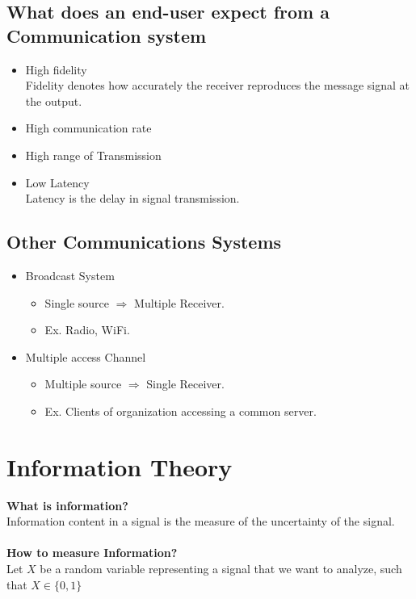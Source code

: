\documentclass{article}
\begin{document}
\newpage
\subsection{What does an end-user expect from a Communication  system}
\Large
\begin{itemize}
    \item High fidelity\\
    Fidelity denotes how accurately the receiver reproduces the message signal at the output.
    \item High communication rate
    \item High range of Transmission
    \item Low Latency \\ 
    Latency is the delay in signal transmission. 
\end{itemize}
\subsection{Other Communications Systems}
\begin{itemize}
    \item Broadcast System
    \begin{itemize}
        \item Single source $\Longrightarrow$ Multiple Receiver.
        \item Ex. Radio, WiFi.
    \end{itemize}
    \item Multiple access Channel
    \begin{itemize}
        \item Multiple source $\Longrightarrow$ Single Receiver.
        \item Ex. Clients of organization accessing a common server.
    \end{itemize}
\end{itemize}

\section{Information Theory}
\Large
\textbf{What is information?}\\
Information content in a signal is the measure of the uncertainty of the signal.\\
\\
\textbf{How to measure Information?}\\
Let $X$ be a random variable representing a signal that we want to analyze, such that $X \in \{0,1\}$\\
\end{document}
